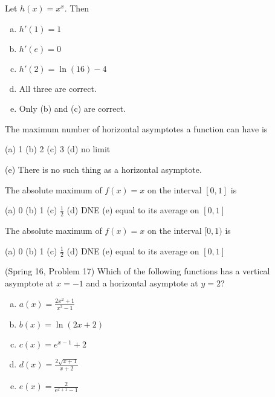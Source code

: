 \documentclass[12pt]{article}
\newcommand{\ds}{\displaystyle}
\newenvironment{problem}[2][Problem]{\begin{trivlist}
\item[\hskip \labelsep {\bfseries #1}\hskip \labelsep {\bfseries #2.}]}{\end{trivlist}}
\begin{document}
\vspace{1.2in}

\begin{problem}{29}
Let $h(x) = x^{x}$. Then 
\begin{enumerate}[(a)]
  \item $h'(1) = 1$
  \item $h'(e) = 0$
  \item $h'(2) = \ln(16) - 4$
  \item All three are correct. 
  \item Only (b) and (c) are correct. 
\end{enumerate}
\end{problem}

\newpage

\begin{problem}{30}
The maximum number of horizontal asymptotes a function can have is
\begin{center}
  (a) 1 \qquad
  (b) 2 \qquad
  (c) 3 \qquad
  (d) no limit
\end{center}
\begin{center}
  (e) There is no such thing as a horizontal asymptote. 
\end{center}
\end{problem}

\vspace{.5in}

\begin{problem}{31}
The absolute maximum of $f(x) = x$ on the interval $[0,1]$ is
\begin{center}
  (a) 0 \qquad
  (b) 1 \qquad
  (c) $\ds\frac{1}{2}$ \qquad
  (d) DNE \qquad
  (e) equal to its average on $[0,1]$
\end{center}
\end{problem}

\vspace{.5in}

\begin{problem}{32}
The absolute maximum of $f(x) = x$ on the interval $[0,1)$ is
\begin{center}
  (a) 0 \qquad
  (b) 1 \qquad
  (c) $\ds\frac{1}{2}$ \qquad
  (d) DNE \qquad
  (e) equal to its average on $[0,1]$
\end{center}
\end{problem}

\vspace{.5in}

\begin{problem}{33}
(Spring 16, Problem 17) Which of the following functions has a vertical asymptote at $x = -1$ and a horizontal asymptote at $y = 2$? 
\begin{enumerate}[(a)]
  \item $a(x) = \ds\frac{2x^{2} + 1}{x^{2} - 1}$
  \item $b(x) = \ln(2x + 2)$
  \item $c(x) = e^{x - 1} + 2$
  \item $d(x) = \ds\frac{2\sqrt{x + 1}}{x + 2}$
  \item $e(x) = \ds\frac{2}{e^{x + 1} - 1}$
\end{enumerate}
\end{problem}
\end{document}
